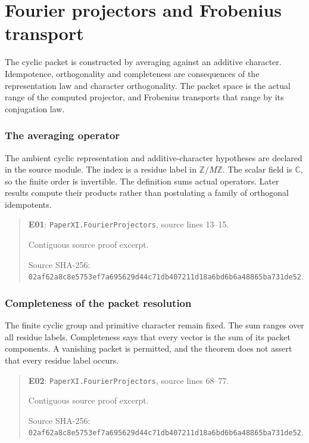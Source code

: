 \documentclass[10pt,oneside]{book}
\begin{document}

\chapter{Fourier projectors and Frobenius transport}
The cyclic packet is constructed by averaging against an additive character. Idempotence, orthogonality and completeness are consequences of the representation law and character orthogonality. The packet space is the actual range of the computed projector, and Frobenius transports that range by its conjugation law.

\subsection{The averaging operator}
\label{guide:E01}
The ambient cyclic representation and additive-character hypotheses are declared in the source module. The index is a residue label in \(\mathbb Z/M\mathbb Z\). The scalar field is \(\mathbb C\), so the finite order is invertible.
The definition sums actual operators. Later results compute their products rather than postulating a family of orthogonal idempotents.

\begin{quote}\footnotesize\textbf{E01}: \nolinkurl{PaperXI.FourierProjectors}, source lines 13--15.\par Contiguous source proof excerpt.\par Source SHA-256: {\scriptsize\texttt{02af62a8c8e5753ef7a695629d44c71db407211d18a6bd6b6a48865ba731de52}}.\end{quote}


\subsection{Completeness of the packet resolution}
\label{guide:E02}
The finite cyclic group and primitive character remain fixed. The sum ranges over all residue labels.
Completeness says that every vector is the sum of its packet components. A vanishing packet is permitted, and the theorem does not assert that every residue label occurs.

\begin{quote}\footnotesize\textbf{E02}: \nolinkurl{PaperXI.FourierProjectors}, source lines 68--77.\par Contiguous source proof excerpt.\par Source SHA-256: {\scriptsize\texttt{02af62a8c8e5753ef7a695629d44c71db407211d18a6bd6b6a48865ba731de52}}.\end{quote}
\end{document}
